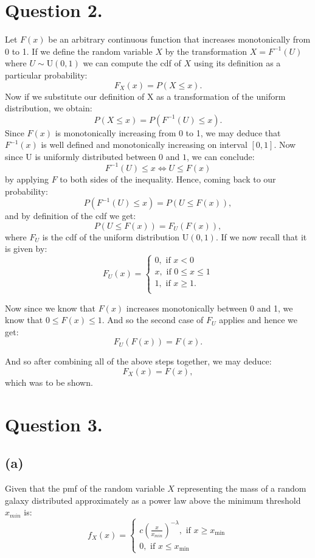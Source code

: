 \documentclass[12pt]{article}
\begin{document}
\section*{Question 2.}
Let $ F(x) $ be an arbitrary continuous function that increases monotonically from 0 to 1. If we define the random variable $ X $ by the transformation $ X = F^{-1} (U) $ where 
$ U \sim \text{U}(0, 1) $ we can compute the cdf of $ X $ using its definition as a particular probability:
\[ F_X (x) = P (X \leq x). \]
Now if we substitute our definition of X as a transformation of the uniform distribution, we obtain:
\[P (X \leq x)  = P ( F^{-1} (U) \leq x).\]
Since $ F(x) $ is monotonically increasing from 0 to 1, we may deduce that 
$ F^{-1} (x) $  is well defined and monotonically increasing on interval $ [0,1] $.
Now since U is uniformly distributed between $ 0 $ and $ 1 $, we can conclude:
\[  F^{-1} (U) \leq x \iff U \leq F(x)\]
by applying $ F $ to both sides of the inequality. Hence, coming back to our probability:
\[P ( F^{-1} (U) \leq x) = P (U \leq F(x)),\]
and by definition of the cdf we get:
\[ P (U \leq F(x)) = F_U (F(x)), \]
where $ F_U $ is the cdf of the uniform distribution $ \text{U}(0, 1) $. If we now recall that it is given by:
\[ 
F_U (x) = 
 \begin{cases}
  0, \text{ if } x < 0 \\
  x, \text{ if } 0 \leq x \leq 1 \\
  1, \text{ if } x \geq 1. \\
 \end{cases}
\]

Now since we know that $ F(x) $ increases monotonically between 0 and 1, we know that
$ 0 \leq F(x) \leq 1 $. And so the second case of $F_U$ applies and hence we get:
\[ F_U (F(x)) = F (x). \]

And so after combining all of the above steps together, we may deduce: 
\[  F_X(x) = F(x),  \]
which was to be shown.

\section*{Question 3.}

\subsection*{(a)}

Given that the pmf of the random variable $X$ representing the mass of a random galaxy 
distributed approximately as a power law above the minimum threshold $ x_{min} $ is:
\[ f_X(x) =
  \begin{cases}
    c \left(\frac{x}{x_{min}}\right)^{-\lambda} , \text{ if } x \geq x_{\text{min}} \\
    0,  \text{ if } x \leq x_{\text{min}}
  \end{cases}
\]
\end{document}
